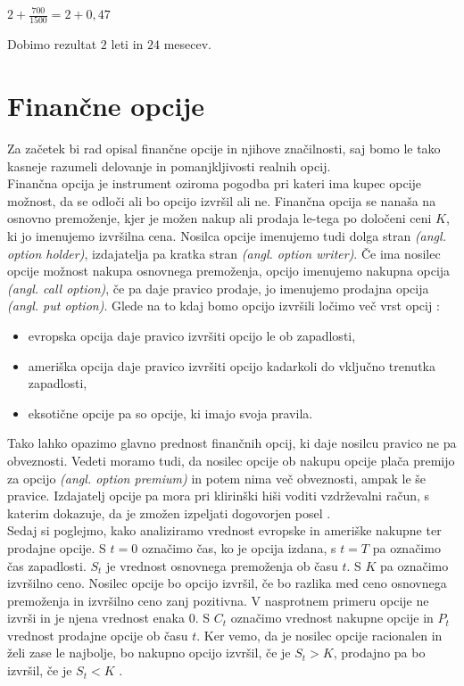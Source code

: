 \begin{center}
$2 + \tfrac{700}{1500} = 2 + 0,47$
\end{center}
Dobimo rezultat $2$ leti in $24$ mesecev.\\


\section{Finančne opcije}
Za začetek bi rad opisal finančne opcije in njihove značilnosti, saj bomo le tako kasneje razumeli delovanje in pomanjkljivosti realnih opcij.\\

Finančna opcija je instrument oziroma pogodba pri kateri ima kupec opcije možnost, da se odloči ali bo opcijo izvršil ali ne. Finančna opcija se nanaša na osnovno premoženje, kjer je možen nakup ali prodaja le-tega po določeni ceni $K$, ki jo imenujemo izvršilna cena. Nosilca opcije imenujemo tudi dolga stran \textit{(angl. option holder)}, izdajatelja pa kratka stran \textit{(angl. option writer)}. Če ima nosilec opcije možnost nakupa osnovnega premoženja, opcijo imenujemo nakupna opcija \textit{(angl. call option)}, če pa daje pravico prodaje, jo imenujemo prodajna opcija \textit{(angl. put option)}. Glede na to kdaj bomo opcijo izvršili ločimo več vrst opcij \cite[str. 53, 54 ]{Kosir}:
\begin{itemize}
\item evropska opcija daje pravico izvršiti opcijo le ob zapadlosti,
\item ameriška opcija daje pravico izvršiti opcijo kadarkoli do vključno trenutka zapadlosti,
\item eksotične opcije pa so opcije, ki imajo svoja pravila.
\end{itemize}
Tako lahko opazimo glavno prednost finančnih opcij, ki daje nosilcu pravico ne pa obveznosti. Vedeti moramo tudi, da nosilec opcije ob nakupu opcije plača premijo za opcijo \textit{(angl. option premium)} in potem nima več obveznosti, ampak le še pravice. Izdajatelj opcije pa mora pri klirinški hiši voditi vzdrževalni račun, s katerim dokazuje, da je zmožen izpeljati dogovorjen posel \cite[str. 54]{Kosir}.\\

Sedaj si poglejmo, kako analiziramo vrednost evropske in ameriške nakupne ter prodajne opcije. S $t=0$ označimo čas, ko je opcija izdana, s $t=T$ pa označimo čas zapadlosti. $S_t$ je vrednost osnovnega premoženja ob času $t$. S $K$ pa označimo izvršilno ceno. Nosilec opcije bo opcijo izvršil, če bo razlika med ceno osnovnega premoženja in izvršilno ceno zanj pozitivna. V nasprotnem primeru opcije ne izvrši in je njena vrednost enaka $0$. S $C_t$ označimo vrednost nakupne opcije in $P_t$ vrednost prodajne opcije ob času $t$. Ker vemo, da je nosilec opcije racionalen in želi zase le najbolje, bo nakupno opcijo izvršil, če je $S_t > K$, prodajno pa bo izvršil, če je $S_t < K$ \cite[str. 54-58]{Kosir}.\\

